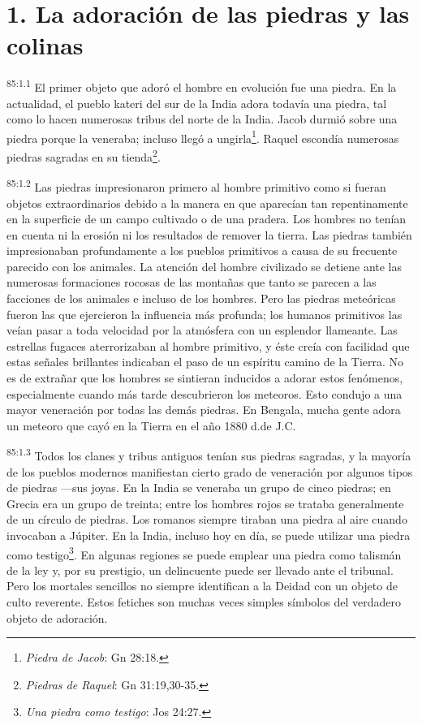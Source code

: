 \section*{1. La adoración de las piedras y las colinas}
\par
\textsuperscript{85:1.1} El primer objeto que adoró el hombre en evolución fue una piedra. En la actualidad, el pueblo kateri del sur de la India adora todavía una piedra, tal como lo hacen numerosas tribus del norte de la India. Jacob durmió sobre una piedra porque la veneraba; incluso llegó a ungirla\footnote{\textit{Piedra de Jacob}: Gn 28:18.}. Raquel escondía numerosas piedras sagradas en su tienda\footnote{\textit{Piedras de Raquel}: Gn 31:19,30-35.}.

\par
\textsuperscript{85:1.2} Las piedras impresionaron primero al hombre primitivo como si fueran objetos extraordinarios debido a la manera en que aparecían tan repentinamente en la superficie de un campo cultivado o de una pradera. Los hombres no tenían en cuenta ni la erosión ni los resultados de remover la tierra. Las piedras también impresionaban profundamente a los pueblos primitivos a causa de su frecuente parecido con los animales. La atención del hombre civilizado se detiene ante las numerosas formaciones rocosas de las montañas que tanto se parecen a las facciones de los animales e incluso de los hombres. Pero las piedras meteóricas fueron las que ejercieron la influencia más profunda; los humanos primitivos las veían pasar a toda velocidad por la atmósfera con un esplendor llameante. Las estrellas fugaces aterrorizaban al hombre primitivo, y éste creía con facilidad que estas señales brillantes indicaban el paso de un espíritu camino de la Tierra. No es de extrañar que los hombres se sintieran inducidos a adorar estos fenómenos, especialmente cuando más tarde descubrieron los meteoros. Esto condujo a una mayor veneración por todas las demás piedras. En Bengala, mucha gente adora un meteoro que cayó en la Tierra en el año 1880 d.de J.C.

\par
\textsuperscript{85:1.3} Todos los clanes y tribus antiguos tenían sus piedras sagradas, y la mayoría de los pueblos modernos manifiestan cierto grado de veneración por algunos tipos de piedras ---sus joyas. En la India se veneraba un grupo de cinco piedras; en Grecia era un grupo de treinta; entre los hombres rojos se trataba generalmente de un círculo de piedras. Los romanos siempre tiraban una piedra al aire cuando invocaban a Júpiter. En la India, incluso hoy en día, se puede utilizar una piedra como testigo\footnote{\textit{Una piedra como testigo}: Jos 24:27.}. En algunas regiones se puede emplear una piedra como talismán de la ley y, por su prestigio, un delincuente puede ser llevado ante el tribunal. Pero los mortales sencillos no siempre identifican a la Deidad con un objeto de culto reverente. Estos fetiches son muchas veces simples símbolos del verdadero objeto de adoración.


